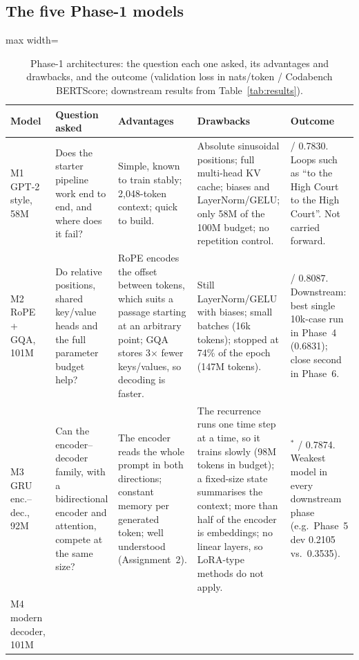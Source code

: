 \documentclass[11pt, oneside]{article}
\begin{document}
\subsection{The five Phase-1 models}
\begin{table}[H]
\centering\scriptsize
\caption{Phase-1 architectures: the question each one asked, its advantages and drawbacks, and the outcome
(validation loss in nats/token / Codabench BERTScore; downstream results from Table~\ref{tab:results}).}
\label{tab:archwhy}
\begin{adjustbox}{max width=\textwidth}
\begin{tabular}{>{\raggedright\arraybackslash}p{1.2cm}>{\raggedright\arraybackslash}p{3.2cm}>{\raggedright\arraybackslash}p{3.6cm}>{\raggedright\arraybackslash}p{3.6cm}>{\raggedright\arraybackslash}p{3.4cm}}
\toprule
Model & Question asked & Advantages & Drawbacks & Outcome\\
\midrule
M1 GPT-2 style, 58M &
Does the starter pipeline work end to end, and where does it fail? &
Simple, known to train stably; 2{,}048-token context; quick to build. &
Absolute sinusoidal positions; full multi-head KV cache; biases and LayerNorm/GELU; only 58M of the 100M budget; no
repetition control. &
4.742 / 0.7830. Loops such as ``to the High Court to the High Court''. Not carried forward.\\
\addlinespace
M2 RoPE + GQA, 101M &
Do relative positions, shared key/value heads and the full parameter budget help? &
RoPE encodes the offset between tokens, which suits a passage starting at an arbitrary point; GQA stores 3$\times$
fewer keys/values, so decoding is faster. &
Still LayerNorm/GELU with biases; small batches (16k tokens); stopped at 74\% of the epoch (147M tokens). &
3.007 / 0.8087. Downstream: best single 10k-case run in Phase~4 (0.6831); close second in Phase~6.\\
\addlinespace
M3 GRU enc.--dec., 92M &
Can the encoder--decoder family, with a bidirectional encoder and attention, compete at the same size? &
The encoder reads the whole prompt in both directions; constant memory per generated token; well understood
(Assignment~2). &
The recurrence runs one time step at a time, so it trains slowly (98M tokens in budget); a fixed-size state summarises
the context; more than half of the encoder is embeddings; no linear layers, so LoRA-type methods do not apply. &
4.808$^*$ / 0.7874. Weakest model in every downstream phase (e.g.\ Phase~5 dev 0.2105 vs.\ 0.3535).\\
\addlinespace
M4 modern decoder, 101M &

\end{tabular}
\end{adjustbox}
\end{table}
\end{document}
